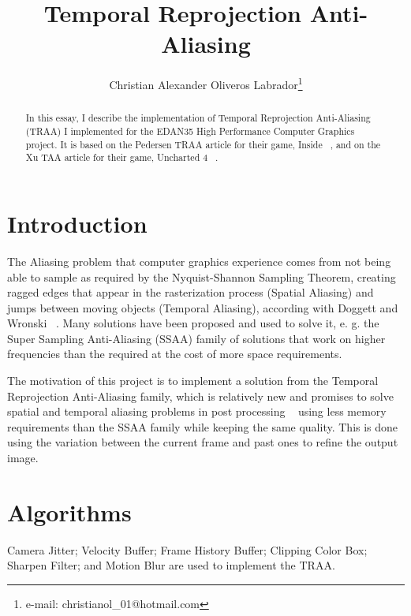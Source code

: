 \documentclass{acmsiggraph}               %
\title{Temporal Reprojection Anti-Aliasing}
\author{Christian Alexander Oliveros Labrador\thanks{e-mail: christianol\_01@hotmail.com} %
}
\affiliation{Lund University\\ Sweden}
\begin{document}
\ifpdf
\else
\fi


\maketitle

\begin{abstract}
In this essay, I describe the implementation of Temporal Reprojection Anti-Aliasing (TRAA) I implemented for the EDAN35 High Performance Computer Graphics project. 
It is based on the Pedersen TRAA article for their game, Inside ~\cite{Fuglsand2016}, and on the Xu TAA article for their game, Uncharted 4 ~\cite{XU2016}.

\end{abstract}


\section{Introduction}
The Aliasing problem that computer graphics experience comes from not being able to sample as required by the Nyquist-Shannon Sampling Theorem, creating ragged edges that appear in the rasterization process (Spatial Aliasing) and jumps between moving objects (Temporal Aliasing), according with Doggett and Wronski  ~\cite{Doggett2017,Wronski2014}. Many solutions have been proposed and used to solve it, e. g. the Super Sampling Anti-Aliasing (SSAA) family of solutions that work on higher frequencies than the required at the cost of more space  requirements. 

The motivation of this project is to  implement a solution from the Temporal Reprojection Anti-Aliasing family, which is relatively new and promises to solve spatial and temporal aliasing problems in post processing ~\cite{Fuglsand2016} using less memory requirements than the SSAA family while keeping the same quality. This is done using the variation between the current frame and past ones to refine the output image.

\section{Algorithms}
Camera Jitter; Velocity Buffer; Frame History Buffer; Clipping Color Box; Sharpen Filter; and Motion Blur are used to implement the TRAA.
\end{document}
